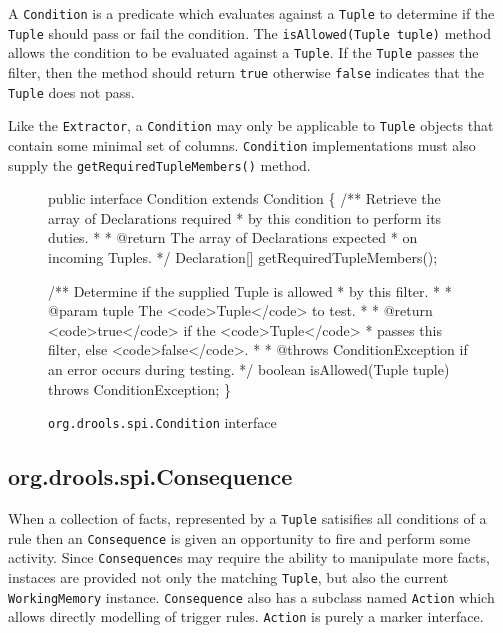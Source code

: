 A \verb|Condition| is a predicate which evaluates against
a \verb|Tuple| to determine if the \verb|Tuple| should pass or
fail the condition. The \verb|isAllowed(Tuple tuple)| method
allows the condition to be evaluated against a \verb|Tuple|.
If the \verb|Tuple| passes the filter, then the method should
return \verb|true| otherwise \verb|false| indicates that
the \verb|Tuple| does not pass.

Like the \verb|Extractor|, a
\verb|Condition| may only be applicable to \verb|Tuple|
objects that contain some minimal set of columns.  
\verb|Condition| implementations must also supply
the \verb|getRequiredTupleMembers()| method.

\begin{figure}
\begin{codelisting}
public interface Condition extends Condition
\{
    /** Retrieve the array of Declarations required
     *  by this condition to perform its duties.
     *
     *  @return The array of Declarations expected
     *          on incoming Tuples.
     */
    Declaration[] getRequiredTupleMembers();

    /** Determine if the supplied Tuple is allowed
     *  by this filter.
     *
     *  @param tuple The <code>Tuple</code> to test.
     *
     *  @return <code>true</code> if the <code>Tuple</code>
     *          passes this filter, else <code>false</code>.
     *
     *  @throws ConditionException if an error occurs during testing.
     */
    boolean isAllowed(Tuple tuple) throws ConditionException;
\}
\end{codelisting}
\label{code.Condition}
\caption{\texttt{org.drools.spi.Condition} interface}
\end{figure}

\subsection{org.drools.spi.Consequence}

When a collection of facts, represented by a \verb|Tuple| satisifies
all conditions of a rule then an \verb|Consequence| is given an opportunity
to fire and perform some activity.  Since \verb|Consequence|s may require
the ability to manipulate more facts, instaces are provided not only
the matching \verb|Tuple|, but also the current \verb|WorkingMemory|
instance. \verb|Consequence| also has a subclass named \verb|Action| which allows
directly modelling of trigger rules.  \verb|Action|  is purely a
marker interface.


